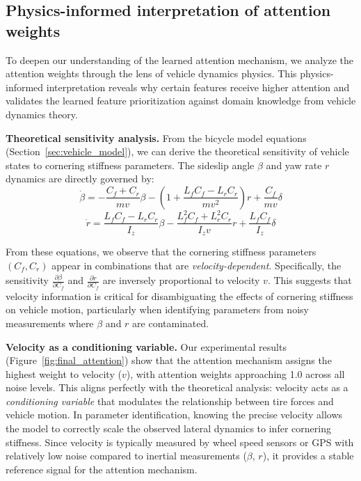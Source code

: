 \documentclass[Afour,sageh,times]{sagej}
\begin{document}
\subsection{Physics-informed interpretation of attention weights}
\label{sec:physics_interpretation}

To deepen our understanding of the learned attention mechanism, we analyze the attention weights through the lens of vehicle dynamics physics. This physics-informed interpretation reveals why certain features receive higher attention and validates the learned feature prioritization against domain knowledge from vehicle dynamics theory.

\textbf{Theoretical sensitivity analysis.} From the bicycle model equations (Section~\ref{sec:vehicle_model}), we can derive the theoretical sensitivity of vehicle states to cornering stiffness parameters. The sideslip angle $\beta$ and yaw rate $r$ dynamics are directly governed by:
\begin{equation}
\dot{\beta} = -\frac{C_f + C_r}{mv}\beta - \left(1 + \frac{L_f C_f - L_r C_r}{mv^2}\right)r + \frac{C_f}{mv}\delta
\end{equation}
\begin{equation}
\dot{r} = \frac{L_f C_f - L_r C_r}{I_z}\beta - \frac{L_f^2 C_f + L_r^2 C_r}{I_z v}r + \frac{L_f C_f}{I_z}\delta
\end{equation}

From these equations, we observe that the cornering stiffness parameters $(C_f, C_r)$ appear in combinations that are \textit{velocity-dependent}. Specifically, the sensitivity $\frac{\partial \dot{\beta}}{\partial C_f}$ and $\frac{\partial \dot{r}}{\partial C_f}$ are inversely proportional to velocity $v$. This suggests that velocity information is critical for disambiguating the effects of cornering stiffness on vehicle motion, particularly when identifying parameters from noisy measurements where $\beta$ and $r$ are contaminated.

\textbf{Velocity as a conditioning variable.} Our experimental results (Figure~\ref{fig:final_attention}) show that the attention mechanism assigns the highest weight to velocity ($v$), with attention weights approaching 1.0 across all noise levels. This aligns perfectly with the theoretical analysis: velocity acts as a \textit{conditioning variable} that modulates the relationship between tire forces and vehicle motion. In parameter identification, knowing the precise velocity allows the model to correctly scale the observed lateral dynamics to infer cornering stiffness. Since velocity is typically measured by wheel speed sensors or GPS with relatively low noise compared to inertial measurements ($\beta$, $r$), it provides a stable reference signal for the attention mechanism.
\end{document}
